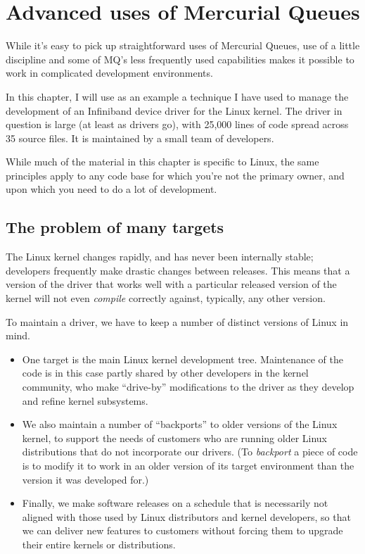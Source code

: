 \chapter{Advanced uses of Mercurial Queues}

While it's easy to pick up straightforward uses of Mercurial Queues,
use of a little discipline and some of MQ's less frequently used
capabilities makes it possible to work in complicated development
environments.

In this chapter, I will use as an example a technique I have used to
manage the development of an Infiniband device driver for the Linux
kernel.  The driver in question is large (at least as drivers go),
with 25,000 lines of code spread across 35 source files.  It is
maintained by a small team of developers.

While much of the material in this chapter is specific to Linux, the
same principles apply to any code base for which you're not the
primary owner, and upon which you need to do a lot of development.

\section{The problem of many targets}

The Linux kernel changes rapidly, and has never been internally
stable; developers frequently make drastic changes between releases.
This means that a version of the driver that works well with a
particular released version of the kernel will not even \emph{compile}
correctly against, typically, any other version.

To maintain a driver, we have to keep a number of distinct versions of
Linux in mind.
\begin{itemize}
\item One target is the main Linux kernel development tree.
  Maintenance of the code is in this case partly shared by other
  developers in the kernel community, who make ``drive-by''
  modifications to the driver as they develop and refine kernel
  subsystems.
\item We also maintain a number of ``backports'' to older versions of
  the Linux kernel, to support the needs of customers who are running
  older Linux distributions that do not incorporate our drivers.  (To
  \emph{backport} a piece of code is to modify it to work in an older
  version of its target environment than the version it was developed
  for.)
\item Finally, we make software releases on a schedule that is
  necessarily not aligned with those used by Linux distributors and
  kernel developers, so that we can deliver new features to customers
  without forcing them to upgrade their entire kernels or
  distributions.
\end{itemize}

